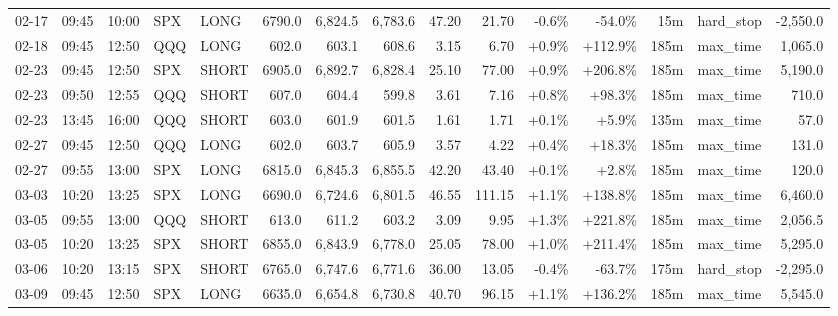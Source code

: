\documentclass[11pt,a4paper,twoside]{article}
\begin{document}
\begin{landscape}
\begin{center}
\begin{longtable}{>{\color{txtmain}}l l l l l r r r r r r r r >{\color{txtmain}}l r}
02-17 & 09:45 & 10:00 & SPX & LONG & 6790.0 & 6,824.5 & 6,783.6 & 47.20 & 21.70 & \textcolor{lossred}{-0.6\%} & \textcolor{lossred}{-54.0\%} & 15m & hard\_stop & \textcolor{lossred}{-2,550.0} \\
02-18 & 09:45 & 12:50 & QQQ & LONG & 602.0 & 603.1 & 608.6 & 3.15 & 6.70 & \textcolor{wingreen}{+0.9\%} & \textcolor{wingreen}{+112.9\%} & 185m & max\_time & \textcolor{wingreen}{1,065.0} \\
02-23 & 09:45 & 12:50 & SPX & SHORT & 6905.0 & 6,892.7 & 6,828.4 & 25.10 & 77.00 & \textcolor{wingreen}{+0.9\%} & \textcolor{wingreen}{+206.8\%} & 185m & max\_time & \textcolor{wingreen}{5,190.0} \\
02-23 & 09:50 & 12:55 & QQQ & SHORT & 607.0 & 604.4 & 599.8 & 3.61 & 7.16 & \textcolor{wingreen}{+0.8\%} & \textcolor{wingreen}{+98.3\%} & 185m & max\_time & \textcolor{wingreen}{710.0} \\
02-23 & 13:45 & 16:00 & QQQ & SHORT & 603.0 & 601.9 & 601.5 & 1.61 & 1.71 & \textcolor{wingreen}{+0.1\%} & \textcolor{wingreen}{+5.9\%} & 135m & max\_time & \textcolor{wingreen}{57.0} \\
02-27 & 09:45 & 12:50 & QQQ & LONG & 602.0 & 603.7 & 605.9 & 3.57 & 4.22 & \textcolor{wingreen}{+0.4\%} & \textcolor{wingreen}{+18.3\%} & 185m & max\_time & \textcolor{wingreen}{131.0} \\
02-27 & 09:55 & 13:00 & SPX & LONG & 6815.0 & 6,845.3 & 6,855.5 & 42.20 & 43.40 & \textcolor{wingreen}{+0.1\%} & \textcolor{wingreen}{+2.8\%} & 185m & max\_time & \textcolor{wingreen}{120.0} \\
03-03 & 10:20 & 13:25 & SPX & LONG & 6690.0 & 6,724.6 & 6,801.5 & 46.55 & 111.15 & \textcolor{wingreen}{+1.1\%} & \textcolor{wingreen}{+138.8\%} & 185m & max\_time & \textcolor{wingreen}{6,460.0} \\
03-05 & 09:55 & 13:00 & QQQ & SHORT & 613.0 & 611.2 & 603.2 & 3.09 & 9.95 & \textcolor{wingreen}{+1.3\%} & \textcolor{wingreen}{+221.8\%} & 185m & max\_time & \textcolor{wingreen}{2,056.5} \\
03-05 & 10:20 & 13:25 & SPX & SHORT & 6855.0 & 6,843.9 & 6,778.0 & 25.05 & 78.00 & \textcolor{wingreen}{+1.0\%} & \textcolor{wingreen}{+211.4\%} & 185m & max\_time & \textcolor{wingreen}{5,295.0} \\
03-06 & 10:20 & 13:15 & SPX & SHORT & 6765.0 & 6,747.6 & 6,771.6 & 36.00 & 13.05 & \textcolor{lossred}{-0.4\%} & \textcolor{lossred}{-63.7\%} & 175m & hard\_stop & \textcolor{lossred}{-2,295.0} \\
03-09 & 09:45 & 12:50 & SPX & LONG & 6635.0 & 6,654.8 & 6,730.8 & 40.70 & 96.15 & \textcolor{wingreen}{+1.1\%} & \textcolor{wingreen}{+136.2\%} & 185m & max\_time & \textcolor{wingreen}{5,545.0} \\

\end{longtable}
\end{center}
\end{landscape}
\end{document}

